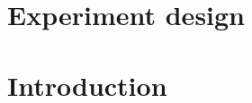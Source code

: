 \documentclass[11pt]{article}
\begin{document}






\section{Experiment design}



\section{Introduction}
\end{document}
